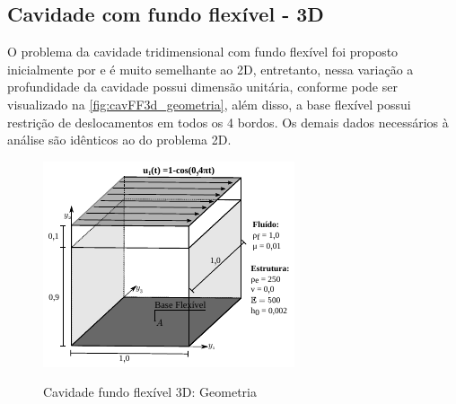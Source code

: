 \begin{figure}[!htbp]
	\label{fig:cavFF2d_press}
\end{figure}

\subsection{Cavidade com fundo flexível - 3D}

O problema da cavidade tridimensional com fundo flexível foi proposto inicialmente por  e é muito semelhante ao 2D, entretanto, nessa variação a profundidade da cavidade possui dimensão unitária, conforme pode ser visualizado na \autoref{fig:cavFF3d_geometria}, além disso, a base flexível possui restrição de deslocamentos em todos os 4 bordos. Os demais dados necessários à análise são idênticos ao do problema 2D.

\begin{figure}[!htbp]
	\caption{Cavidade fundo flexível 3D: Geometria}
	\centering 
	\includegraphics[scale=1.8,trim=0cm 0cm 0cm 0cm, clip=true]{Imagens/Cap7/cavFF3d_geometria.pdf}	
	\label{fig:cavFF3d_geometria}
\end{figure}

